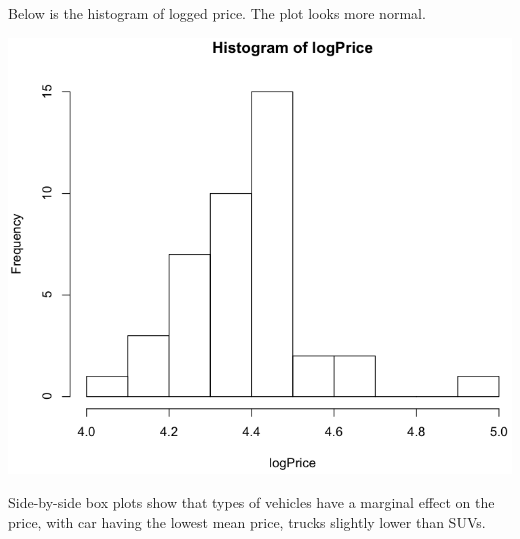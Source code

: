 \documentclass[a4 paper, 11 pt]{article}
\begin{document}
Below is the histogram of logged price. The plot looks more normal.
\begin{center}
\includegraphics[scale=0.3]{histlogprice}
\end{center}
Side-by-side box plots show that types of vehicles have a marginal effect on the price, with car having the lowest mean price, trucks slightly lower than SUVs.
\end{document}

